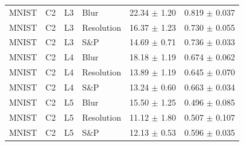 \begin{table}[htbp]
\begin{tabular}{llllrr}
MNIST & C2 & L3 & Blur & 22.34 $\pm$ 1.20 & 0.819 $\pm$ 0.037 \\
MNIST & C2 & L3 & Resolution & 16.37 $\pm$ 1.23 & 0.730 $\pm$ 0.055 \\
MNIST & C2 & L3 & S\&P & 14.69 $\pm$ 0.71 & 0.736 $\pm$ 0.033 \\
MNIST & C2 & L4 & Blur & 18.18 $\pm$ 1.19 & 0.674 $\pm$ 0.062 \\
MNIST & C2 & L4 & Resolution & 13.89 $\pm$ 1.19 & 0.645 $\pm$ 0.070 \\
MNIST & C2 & L4 & S\&P & 13.24 $\pm$ 0.60 & 0.663 $\pm$ 0.034 \\
MNIST & C2 & L5 & Blur & 15.50 $\pm$ 1.25 & 0.496 $\pm$ 0.085 \\
MNIST & C2 & L5 & Resolution & 11.12 $\pm$ 1.80 & 0.507 $\pm$ 0.107 \\
MNIST & C2 & L5 & S\&P & 12.13 $\pm$ 0.53 & 0.596 $\pm$ 0.035 \\
\bottomrule
\end{tabular}
\end{table}
